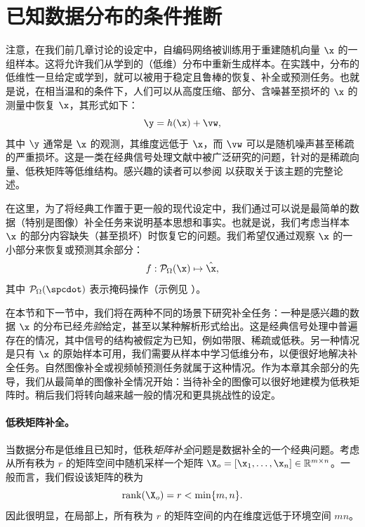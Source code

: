 \documentclass[../../book-main_zh.tex]{subfiles}
\begin{document}
\section{已知数据分布的条件推断}
注意，在我们前几章讨论的设定中，自编码网络被训练用于重建随机向量 $\x$ 的一组样本。这将允许我们从学到的（低维）分布中重新生成样本。在实践中，分布的低维性一旦给定或学到，就可以被用于稳定且鲁棒的恢复、补全或预测任务。也就是说，在相当温和的条件下，人们可以从高度压缩、部分、含噪甚至损坏的 $\x$ 的测量中恢复 $\x$，其形式如下：
\begin{equation}
    \y = h(\x) + \vw,
\end{equation}
其中 $\y$ 通常是 $\x$ 的观测，其维度远低于 $\x$，而 $\vw$ 可以是随机噪声甚至稀疏的严重损坏。这是一类在经典信号处理文献中被广泛研究的问题，针对的是稀疏向量、低秩矩阵等低维结构。感兴趣的读者可以参阅 \cite{Wright-Ma-2022} 以获取关于该主题的完整论述。

在这里，为了将经典工作置于更一般的现代设定中，我们通过可以说是最简单的数据（特别是图像）补全任务来说明基本思想和事实。也就是说，我们考虑当样本 $\x$ 的部分内容缺失（甚至损坏）时恢复它的问题。我们希望仅通过观察 $\x$ 的一小部分来恢复或预测其余部分：
\begin{equation}
    f: \mathcal{P}_{\Omega}(\x) \mapsto \hat{\x},
\end{equation}
其中 $\mathcal{P}_{\Omega}(\spcdot)$ 表示掩码操作（示例见 ）。

在本节和下一节中，我们将在两种不同的场景下研究补全任务：一种是感兴趣的数据 $\x$ 的分布已经{\em 先验}给定，甚至以某种解析形式给出。这是经典信号处理中普遍存在的情况，其中信号的结构被假定为已知，例如带限、稀疏或低秩。另一种情况是只有 $\x$ 的原始样本可用，我们需要从样本中学习低维分布，以便很好地解决补全任务。自然图像补全或视频帧预测任务就属于这种情况。作为本章其余部分的先导，我们从最简单的图像补全情况开始：当待补全的图像可以很好地建模为低秩矩阵时。稍后我们将转向越来越一般的情况和更具挑战性的设定。

\paragraph{低秩矩阵补全。}
当数据分布是低维且已知时，低秩{\em 矩阵补全}问题是数据补全的一个经典问题。考虑从所有秩为 $r$ 的矩阵空间中随机采样一个矩阵 $\X_o =
[\x_1, \ldots, \x_n] \in \mathbb{R}^{m\times n}$。一般而言，我们假设该矩阵的秩为
\begin{equation}
    \operatorname{rank}(\X_o) = r < \min\{m, n\}.
\end{equation}
因此很明显，在局部上，所有秩为 $r$ 的矩阵空间的内在维度远低于环境空间 $mn$。
\end{document}
